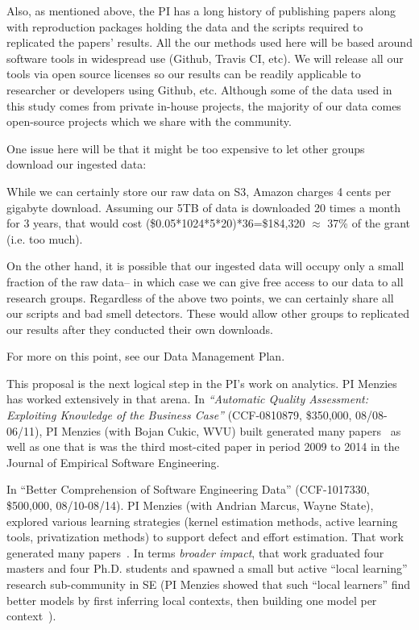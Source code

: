 Also, as mentioned above, the PI has a long history of publishing papers along with reproduction packages holding the data and the scripts required to
replicated the papers' results. All the our methods used here will be based around software tools in widespread   use (Github, Travis CI, etc).  We will release all our tools via open source licenses so our results can be readily applicable to researcher or developers using   Github, etc.
Although some of the data used in this study comes from private in-house projects,
the majority of our data comes open-source projects which we share with the community.

One issue here will be that it might be  too expensive
to let other groups download our  ingested data:
\bi
\item While we can certainly store our raw data on  S3,  Amazon   charges 4 cents per gigabyte download. Assuming our 5TB of data is downloaded 20 times a month for 3 years, that would cost \newline (\$0.05*1024*5*20)*36=\$184,320 $\approx$ 37\% of the grant (i.e. too much).
\item On the other hand, it is possible that our ingested data will occupy only a small fraction of the raw data-- in which case we can give free access
to our data to all
research groups.
\ei
Regardless of the above two points, we can certainly share all our scripts and bad smell detectors. These would allow other groups to replicated our results
after they conducted their own downloads.
 
 For more on this point, see our Data Management Plan.

 


This proposal is the next logical step in the PI's work on analytics.
{PI Menzies} has worked extensively in that arena.
In
\emph{``Automatic
Quality Assessment: Exploiting Knowledge of the Business Case''} (CCF-0810879, \$350,000, 08/08-06/11),
{PI Menzies} (with Bojan Cukic, WVU) built   generated many papers~\cite{jiang08a,me09n,me09i,me09b,me10d}
as well as one that is  was the third most-cited
paper in period 2009 to 2014 in the Journal of Empirical Software
Engineering.

In ``Better Comprehension of Software Engineering Data'' (CCF-1017330, \$500,000, 08/10-08/14).
{PI Menzies} (with Andrian Marcus, Wayne State),
explored various learning strategies (kernel estimation
methods, active learning tools, privatization methods) to
support defect and effort estimation. That work generated many papers~\cite{Bavota2010,Bavota2012a,Bavota2013,Bavota2012b,Haiduc2010a, Haiduc2013a, Haiduc2012a, Haiduc2013b, Marcus2010b, Ohlemacher2011b, Scanniello2013, Scanniello2011,me11m, peters12,Me13,me13a,peters12a}.
In terms \emph{broader impact}, that work graduated four masters and four Ph.D. students
and
spawned a small but active ``local learning'' research sub-community in SE (PI Menzies showed that
such ``local learners'' find better models
by first inferring local contexts, then building one model per context~\cite{Me13,me11m}).

